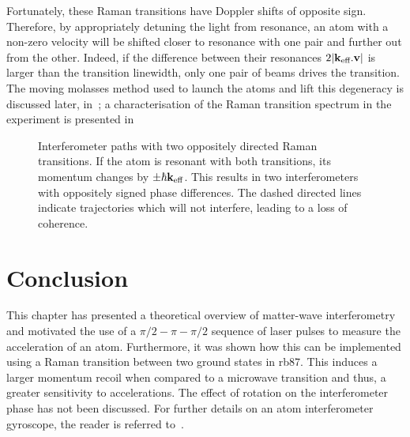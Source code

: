 Fortunately, these Raman transitions have Doppler shifts of
opposite sign. Therefore, by appropriately detuning the light from
resonance, an atom with a non-zero velocity will be shifted closer to
resonance with one pair and further out from the other. Indeed, if
the difference between their resonances $2 |{\textbf k_\textnormal{eff}}.\textbf{v}|$ is
larger than the transition linewidth, only one pair of beams drives
the transition. The moving molasses method used to launch the atoms
and lift this degeneracy is
discussed later, in~; a characterisation of the Raman
transition spectrum in the experiment is presented
in~ 
\begin{figure}[htpb]
  \centering
  \resizebox{0.4\textwidth}{!}{}
  \caption[Interferometer paths with two oppositely directed Raman
  transitions.]{Interferometer paths with two oppositely directed Raman
  transitions. If the atom is resonant with both transitions, its
momentum changes by $\pm \hbar {\textbf k_\textnormal{eff}}$. This results in two
interferometers with oppositely signed phase differences. The dashed
directed lines indicate trajectories which will not interfere, leading
to a loss of coherence.}
\label{fig:double_int_path}
\end{figure}


\section{Conclusion}
This chapter has presented a theoretical overview of matter-wave
interferometry and motivated the use of a $\pi/2-\pi-\pi/2$ sequence
of laser pulses to measure the acceleration of an atom. Furthermore,
it was shown how this can be implemented using a Raman transition
between two ground states in
\ac{rb87}. This induces a larger momentum recoil when compared to a
microwave transition and thus, a greater sensitivity to accelerations.
The effect of rotation on the interferometer phase has not been
discussed. For further details on an atom interferometer gyroscope,
the reader is referred to~\cite{Gauguet2009}.
\nocite{Dubetsky2006}
\nocite{Han2012}
